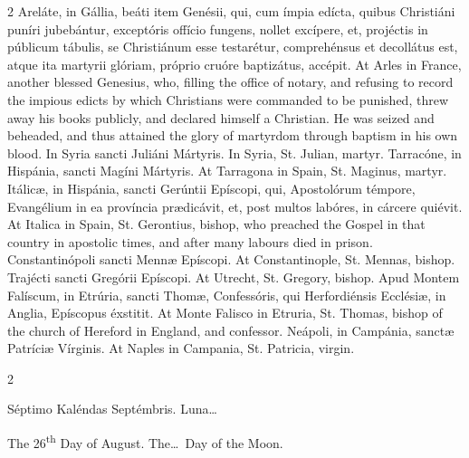 \begin{paracol}{2}
Areláte, in Gállia, 
 beáti item Genésii, qui, cum ímpia edícta, quibus Christiáni puníri 
 jubebántur, exceptóris offício fungens, nollet excípere, et, projéctis in 
 públicum tábulis, se Christiánum esse testarétur, comprehénsus et decollátus 
 est, atque ita martyrii glóriam, próprio cruóre baptizátus, accépit.
\switchcolumn
{}
At Arles in France, another blessed 
 Genesius, who, filling the office of notary, and refusing to record the 
 impious edicts by which Christians were commanded to be punished, threw away 
 his books publicly, and declared himself a Christian. He was seized 
 and beheaded, and thus attained the glory of martyrdom through baptism in 
 his own blood.
\switchcolumn*
{}
In Syria sancti Juliáni 
 Mártyris.
\switchcolumn
{}
In Syria, St. Julian, martyr.
\switchcolumn*
{}
Tarracóne, in Hispánia, 
 sancti Magíni Mártyris.
\switchcolumn
{}
At Tarragona in Spain, St. Maginus, 
 martyr.
\switchcolumn*
{}
Itálicæ, in Hispánia, 
 sancti Gerúntii Epíscopi, qui, Apostolórum témpore, Evangélium in ea 
 província prædicávit, et, post multos labóres, in cárcere quiévit.
\switchcolumn
{}
At Italica in Spain, St. Gerontius, 
 bishop, who preached the Gospel in that country in apostolic times, and 
 after many labours died in prison.
\switchcolumn*
{}
Constantinópoli sancti 
 Mennæ Epíscopi.
\switchcolumn
{}
At Constantinople, St. Mennas, 
 bishop.
\switchcolumn*
{}
Trajécti sancti 
 Gregórii Epíscopi.
\switchcolumn
{}
At Utrecht, St. Gregory, bishop.
\switchcolumn*
{}
Apud Montem Falíscum, 
 in Etrúria, sancti Thomæ, Confessóris, qui Herfordiénsis Ecclésiæ, in 
 Anglia, Epíscopus éxstitit.
\switchcolumn
{}
At Monte Falisco in Etruria, St. 
 Thomas, bishop of the church of Hereford in England, and confessor.
\switchcolumn*
{}
Neápoli, in Campánia, 
 sanctæ Patríciæ Vírginis.
\switchcolumn
{}
At Naples in Campania, St. Patricia, 
 virgin.
\switchcolumn*
{}
\end{paracol}


\begin{paracol}{2}
\begin{center}{\color{gregoriocolor} Séptimo Kaléndas Septémbris. 
 Luna\dots\ }\end{center}
\switchcolumn
{}
\begin{center}{\color{gregoriocolor} The 
 26\textsuperscript{th} Day of 
 August. The\dots\ Day of the Moon.}\end{center}
\end{paracol}


